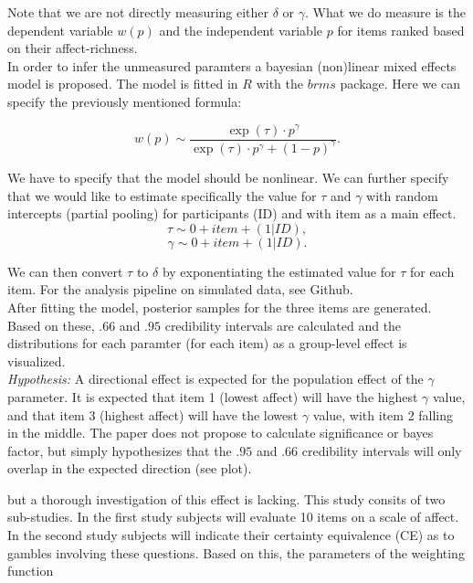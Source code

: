 \documentclass[12pt]{article}
\begin{document}
Note that we are not directly measuring either
$\delta$ or $\gamma$. What we do measure is the
dependent variable $w(p)$ and the independent
variable $p$ for items ranked based on their
affect-richness. \\

In order to infer the
unmeasured paramters a bayesian (non)linear
mixed effects model is proposed. The model
is fitted in $R$ with the  $brms$ package.
Here we can specify the previously
mentioned formula:

 \[
	 w(p) \sim \frac{\exp({\tau})\cdot p^{\gamma}}
	 {\exp({\tau})\cdot p^{\gamma}+(1-p)^{\gamma}}
.\]

We have to specify that the model should
be nonlinear. We can further specify that we would like to
estimate specifically the value for $\tau$
and $\gamma$ with random intercepts (partial pooling)
for participants (ID) and with item as a main
effect. \\

 \[
	 \tau \sim 0 + item + (1|ID),
\]
\[
	\gamma \sim 0 + item + (1|ID)
.\]

We can then convert $\tau$ to $\delta$
by exponentiating the estimated value
for $\tau$ for each item. For the analysis
pipeline on simulated data, see Github. \\

After fitting the model, posterior samples
for the three items are generated. Based on
these, $.66$ and $.95$ credibility intervals
are calculated and the distributions for each
paramter (for each item) as a group-level effect
is visualized. \\

\emph{Hypothesis:} A directional effect is
expected for the population effect of the
$\gamma$ parameter. It is expected that
item 1 (lowest affect) will have the highest
$\gamma$ value, and that item 3 (highest affect)
will have the lowest $\gamma$ value, with
item 2 falling in the middle. The paper
does not propose to calculate significance
or bayes factor, but simply hypothesizes that
the $.95$ and $.66$ credibility intervals
will only overlap in the expected direction
(see plot).







but a thorough investigation
of this effect is lacking. This study consits
of two sub-studies. In the first study subjects
will evaluate 10 items on a scale of affect.
In the second study subjects will indicate their
certainty equivalence (CE) as to gambles
involving these questions. Based on this, the
parameters of the weighting function
\end{document}
